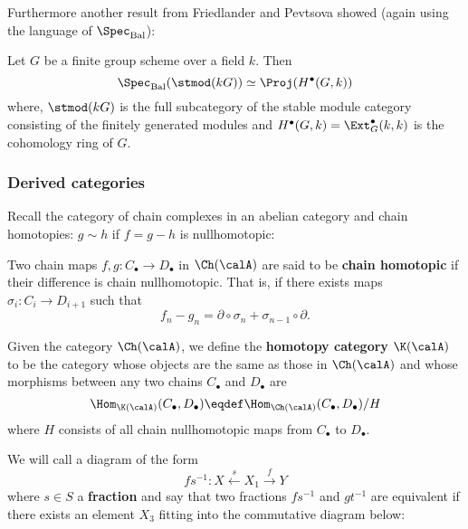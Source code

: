 \documentclass[12pt]{article}
\begin{document}
	Furthermore another result from Friedlander and Pevtsova \cite{friedlander-pevtsova-pi} showed (again using 
	the language of $\Spec_\text{Bal}$):
	\begin{thm}
		Let $G$ be a finite group scheme over a field $k$. Then 
		\[\Spec_\text{Bal}(\stmod(kG))\simeq\Proj(H^\bullet(G,k))\]
		where, $\stmod(kG)$ is the full subcategory of the stable module category consisting of the finitely generated modules and $H^\bullet(G,k)=\Ext_G^\bullet(k,k)$ is the cohomology ring of $G$.
	\end{thm}

		\subsubsection{Derived categories}
		Recall the category of chain complexes in an abelian category and chain homotopies: $g\sim h$ if $f=g-h$ is nullhomotopic:
		\begin{defn}
			Two chain maps $f,g:C_\bullet\to D_\bullet$ in $\Ch(\calA)$ are said to be \textbf{chain homotopic} if their difference is chain nullhomotopic. That is, if 
			there exists maps $\sigma_i:C_i\to D_{i+1}$ such that 
			\[f_n-g_n=\partial\circ\sigma_n+\sigma_{n-1}\circ\partial.\]
		\end{defn}

		\begin{defn}
			Given the category $\Ch(\calA)$, we define the \textbf{homotopy category} $\K(\calA)$ to be the category whose objects are the 
			same as those in $\Ch(\calA)$ and whose morphisms between any two chains $C_\bullet$ and $D_\bullet$ are 
			\[\Hom_{\K(\calA)}(C_\bullet,D_\bullet)\eqdef \Hom_{\Ch(\calA)}(C_\bullet,D_\bullet)/H\]
			where $H$ consists of all chain nullhomotopic maps from $C_\bullet$ to $D_\bullet$.
		\end{defn}
		We will call a diagram of the form 
		\[fs^{-1}:X\xleftarrow{s} X_1\xrightarrow{f} Y\]
		where $s\in S$ a \textbf{fraction} and say that two fractions $fs^{-1}$ and $gt^{-1}$ are equivalent if there exists an element $X_3$ fitting 
		into the commutative diagram below:
		\begin{center}
		\end{center}
\end{document}
